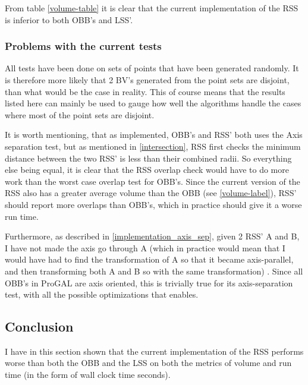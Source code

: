 From table \ref{volume-table} it is clear that the current implementation of the RSS is inferior to both OBB's and LSS'.

\subsubsection{Problems with the current tests}
\label{test_problems}
All tests have been done on sets of points that have been generated randomly. It is therefore more likely that 2 BV's generated from the point sets are disjoint, than what would be the case in reality. This of course means that the results listed here can mainly be used to gauge how well the algorithms handle the cases where most of the point sets are disjoint.

It is worth mentioning, that as implemented, OBB's and RSS' both uses the Axis separation test, but as mentioned in \ref{intersection}, RSS first checks the minimum distance between the two RSS' is less than their combined radii. So everything else being equal, it is clear that the RSS overlap check would have to do more work than the worst case overlap test for OBB's. Since the current version of the RSS also has a greater average volume than the OBB (see \ref{volume-label}), RSS' should report more overlaps than OBB's, which in practice should give it a worse run time.
 
Furthermore, as described in \ref{implementation_axis_sep}, given 2 RSS' A and B, I have not made the axis go through A (which in practice would mean that I would have had to find the transformation of A so that it became axis-parallel, and then transforming both A and B so with the same transformation) . Since all OBB's in ProGAL are axis oriented, this is trivially true for its axis-separation test, with all the possible optimizations that enables.

\subsection{Conclusion}
I have in this section shown that the current implementation of the RSS performs worse than both the OBB and the LSS on both the metrics of volume and run time (in the form of wall clock time seconds).
